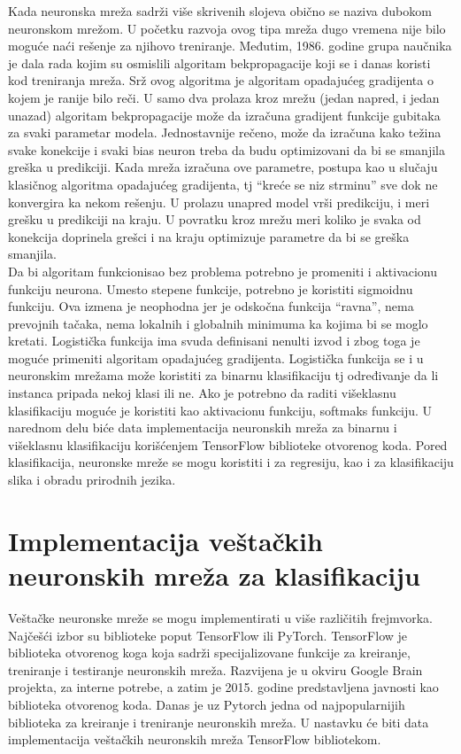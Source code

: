 \documentclass[a4paper,12pt]{report}
\begin{document}
Kada neuronska mreža sadrži više skrivenih slojeva obično se naziva dubokom neuronskom mrežom. U početku razvoja ovog tipa mreža dugo vremena nije bilo moguće naći rešenje za njihovo treniranje. Međutim, 1986. godine grupa naučnika je dala rada kojim su osmislili algoritam bekpropagacije koji se i danas koristi kod treniranja mreža. Srž ovog algoritma je algoritam opadajućeg gradijenta o kojem je ranije bilo reči. U samo dva prolaza kroz mrežu (jedan napred, i jedan unazad) algoritam bekpropagacije može da izračuna gradijent funkcije gubitaka za svaki parametar modela. Jednostavnije rečeno, može da izračuna kako težina svake konekcije i svaki bias neuron treba da budu optimizovani da bi se smanjila greška u predikciji. Kada mreža izračuna ove parametre, postupa kao u slučaju klasičnog algoritma opadajućeg gradijenta, tj \enquote{kreće se niz strminu} sve dok ne konvergira ka nekom rešenju. U prolazu unapred model vrši predikciju, i meri grešku u predikciji na kraju. U povratku kroz mrežu meri koliko je svaka od konekcija doprinela grešci i na kraju optimizuje parametre da bi se greška smanjila. \\

Da bi algoritam funkcionisao bez problema potrebno je promeniti i aktivacionu funkciju neurona. Umesto stepene funkcije, potrebno je koristiti sigmoidnu funkciju. Ova izmena je neophodna jer je odskočna funkcija \enquote{ravna}, nema prevojnih tačaka, nema lokalnih i globalnih minimuma ka kojima bi se moglo kretati. Logistička funkcija ima svuda definisani nenulti izvod i zbog toga je moguće primeniti algoritam opadajućeg gradijenta. Logistička funkcija se i u neuronskim mrežama može koristiti za binarnu klasifikaciju tj određivanje da li instanca pripada nekoj klasi ili ne. Ako je potrebno da raditi višeklasnu klasifikaciju moguće je koristiti kao aktivacionu funkciju, softmaks funkciju. U narednom delu biće data implementacija neuronskih mreža za binarnu i višeklasnu klasifikaciju korišćenjem TensorFlow biblioteke otvorenog koda. Pored klasifikacija, neuronske mreže se mogu koristiti i za regresiju, kao i za klasifikaciju slika i obradu prirodnih jezika. \\

 \section{Implementacija veštačkih neuronskih mreža za klasifikaciju}

Veštačke neuronske mreže se mogu implementirati u više različitih frejmvorka. Najčešći izbor su biblioteke poput TensorFlow ili PyTorch. TensorFlow je biblioteka otvorenog koga koja sadrži specijalizovane funkcije za kreiranje, treniranje i testiranje neuronskih mreža. Razvijena je u okviru Google Brain projekta, za interne potrebe, a zatim je 2015. godine predstavljena javnosti kao biblioteka otvorenog koda. Danas je uz Pytorch jedna od najpopularnijih biblioteka za kreiranje i treniranje neuronskih mreža. U nastavku će biti data implementacija veštačkih neuronskih mreža TensorFlow bibliotekom. \\
\end{document}

